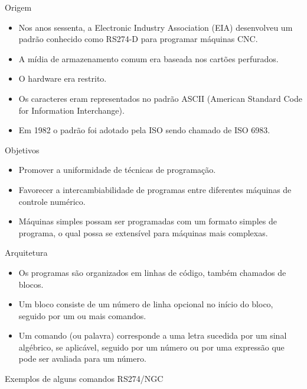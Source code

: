 \documentclass[aspectratio=169]{beamer}
\begin{document}
{\begin{frame}{Origem}
  \begin{itemize}
  \item {
    Nos anos sessenta, a Electronic Industry Association (EIA) desenvolveu um 
    padrão conhecido como RS274-D para programar máquinas CNC.
  }
  \item {
    A mídia de armazenamento comum era baseada nos cartões perfurados.
  }
  \item {
    O hardware era restrito.
  }
  \item {
    Os caracteres eram representados no padrão ASCII (American Standard Code for Information Interchange).
  }
  \item {
    Em 1982 o padrão foi adotado pela ISO sendo chamado de ISO 6983.
  }
  \end{itemize}
\end{frame}


\begin{frame}{Objetivos}
  \begin{itemize}
  \item {
    Promover a uniformidade de técnicas de programação.
  }
  \item {
    Favorecer a intercambiabilidade de programas entre diferentes máquinas de controle numérico.
  }
  \item {
    Máquinas simples possam ser programadas com um formato simples de programa,
    o qual possa se extensível para máquinas mais complexas.
  }
  \end{itemize}
\end{frame}


\begin{frame}{Arquitetura}
  \begin{itemize}
  \item {
    Os programas são organizados em linhas de código, também chamados de blocos.
  }
  \item {
    Um bloco consiste de um número de linha opcional no início do bloco, seguido por um 
    ou mais comandos.
  }
  \item {
    Um comando (ou palavra) corresponde a uma letra sucedida por um sinal algébrico, se aplicável, 
    seguido por um número ou por uma expressão que pode ser avaliada para um número.
  }
  \end{itemize}
\end{frame}


\begin{frame}{Exemplos de alguns comandos RS274/NGC}


\end{frame}}
\end{document}
